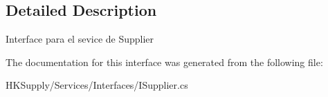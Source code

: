 \subsection{Detailed Description}
Interface para el sevice de Supplier 



The documentation for this interface was generated from the following file\+:\begin{DoxyCompactItemize}
\item 
H\+K\+Supply/\+Services/\+Interfaces/I\+Supplier.\+cs\end{DoxyCompactItemize}

